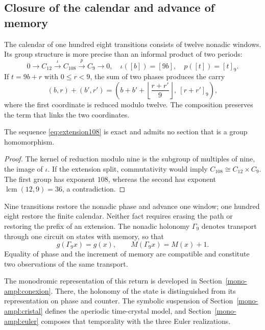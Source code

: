 \subsection{Closure of the calendar and advance of memory}

The calendar of one hundred eight transitions consists of twelve nonadic windows. Its group structure is more precise than an informal product of two periods:
\begin{equation}
 0\longrightarrow C_{12}\xrightarrow{\iota}C_{108}
 \xrightarrow{p}C_9\longrightarrow0,
 \quad\iota([b])=[9b],\quad p([t])=[t]_9.
 \label{eq:extension108}
\end{equation}
If \(t=9b+r\) with \(0\le r<9\), the sum of two phases produces the carry
\[
 (b,r)+(b',r')=
 \left(b+b'+\left\lfloor\frac{r+r'}9\right\rfloor,\ [r+r']_9\right),
\]
where the first coordinate is reduced modulo twelve. The composition preserves the term that links the two coordinates.

\begin{proposition}
The sequence \eqref{eq:extension108} is exact and admits no section that is a group homomorphism.
\end{proposition}
\begin{proof}
The kernel of reduction modulo nine is the subgroup of multiples of nine, the image of \(\iota\). If the extension split, commutativity would imply \(C_{108}\cong C_{12}\times C_9\). The first group has exponent \(108\), whereas the second has exponent \(\operatorname{lcm}(12,9)=36\), a contradiction.
\end{proof}

Nine transitions restore the nonadic phase and advance one window; one hundred eight restore the finite calendar. Neither fact requires erasing the path or restoring the prefix of an extension. The nonadic holonomy \(\Gamma_9\) denotes transport through one circuit on states with memory, so that
\begin{equation}
 g(\Gamma_9x)=g(x),\qquad M(\Gamma_9x)=M(x)+1.
 \label{eq:holonomia-memoria}
\end{equation}
Equality of phase and the increment of memory are compatible and constitute two observations of the same transport.



The monodromic representation of this return is developed in
Section~\ref{mono-ampl:conexion}. There, the holonomy of the
state is distinguished from its representation on phase and counter. The
symbolic suspension of Section~\ref{mono-ampl:cristal} defines the
aperiodic time-crystal model, and Section~\ref{mono-ampl:euler}
composes that temporality with the three Euler realizations.

